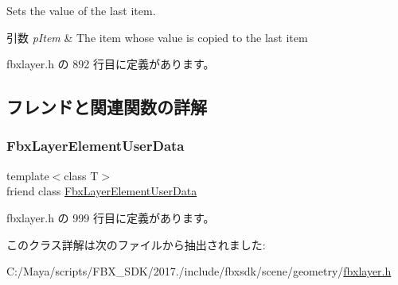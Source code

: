 Sets the value of the last item. 
\begin{DoxyParams}{引数}
{\em p\+Item} & The item whose value is copied to the last item \\
\hline
\end{DoxyParams}


 fbxlayer.\+h の 892 行目に定義があります。



\subsection{フレンドと関連関数の詳解}
\mbox{\label{class_fbx_layer_element_array_template_a63a2f2e250c191762d21c915d679bbc9}} 
\subsubsection{\texorpdfstring{Fbx\+Layer\+Element\+User\+Data}{FbxLayerElementUserData}}
{\footnotesize\ttfamily template$<$class T$>$ \\
friend class \hyperlink{class_fbx_layer_element_user_data}{Fbx\+Layer\+Element\+User\+Data}\hspace{0.3cm}{\ttfamily [friend]}}



 fbxlayer.\+h の 999 行目に定義があります。



このクラス詳解は次のファイルから抽出されました\+:\begin{DoxyCompactItemize}
\item 
C\+:/\+Maya/scripts/\+F\+B\+X\+\_\+\+S\+D\+K/2017./include/fbxsdk/scene/geometry/\hyperlink{fbxlayer_8h}{fbxlayer.\+h}\end{DoxyCompactItemize}
